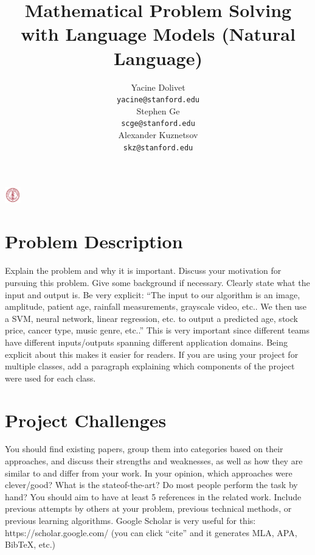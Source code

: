 \documentclass{article}
\title{Mathematical Problem Solving with Language Models (Natural Language)}
\author{
  Yacine Dolivet\\
  \texttt{yacine@stanford.edu} \\
  \And
  Stephen Ge\\
  \texttt{scge@stanford.edu} \\
   \And
  Alexander Kuznetsov\\
  \texttt{skz@stanford.edu} \\
}
\begin{document}

\begin{center}
\includegraphics[width=0.7cm, height=0.7cm]{stanford.png}
\end{center}

\maketitle


\section{Problem Description}	
Explain the problem and why it is important. Discuss your motivation for pursuing this
problem. Give some background if necessary. Clearly state what the input and output
is. Be very explicit: “The input to our algorithm is an {image, amplitude, patient age,
rainfall measurements, grayscale video, etc.}. We then use a {SVM, neural network, linear
regression, etc.} to output a predicted {age, stock price, cancer type, music genre, etc.}.”
This is very important since different teams have different inputs/outputs spanning different
application domains. Being explicit about this makes it easier for readers. If you are using
your project for multiple classes, add a paragraph explaining which components of the
project were used for each class.

\section{Project Challenges}
You should find existing papers, group them into categories based on their approaches,
and discuss their strengths and weaknesses, as well as how they are similar to and differ
from your work. In your opinion, which approaches were clever/good? What is the stateof-the-art?
Do most people perform the task by hand? You should aim to have at least
5 references in the related work. Include previous attempts by others at your problem,
previous technical methods, or previous learning algorithms. Google Scholar is very useful
for this: https://scholar.google.com/ (you can click “cite” and it generates MLA, APA,
BibTeX, etc.)
\end{document}
